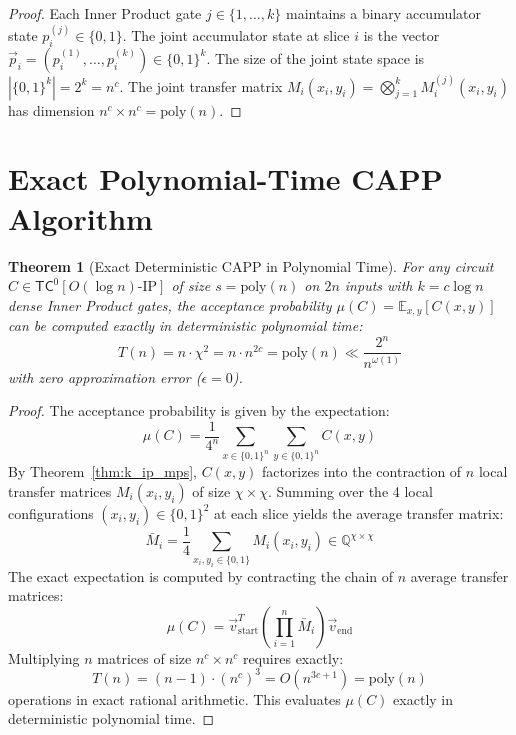\documentclass[11pt,letterpaper]{article}
\newtheorem{theorem}{Theorem}[section]
\newcommand{\TC}{\mathsf{TC}}
\newcommand{\poly}{\mathrm{poly}}
\newcommand{\E}{\mathbb{E}}
\newcommand{\eps}{\epsilon}
\begin{document}
\begin{proof}
Each Inner Product gate $j \in \{1, \dots, k\}$ maintains a binary accumulator state $p^{(j)}_i \in \{0, 1\}$. The joint accumulator state at slice $i$ is the vector $\vec{p}_i = (p^{(1)}_i, \dots, p^{(k)}_i) \in \{0, 1\}^k$. The size of the joint state space is $|\{0, 1\}^k| = 2^k = n^c$. The joint transfer matrix $M_i(x_i, y_i) = \bigotimes_{j=1}^k M_i^{(j)}(x_i, y_i)$ has dimension $n^c \times n^c = \poly(n)$.
\end{proof}

\section{Exact Polynomial-Time CAPP Algorithm}

\begin{theorem}[Exact Deterministic CAPP in Polynomial Time]
\label{thm:exact_capp}
For any circuit $C \in \TC^0[O(\log n)\text{-}\mathrm{IP}]$ of size $s = \poly(n)$ on $2n$ inputs with $k = c \log n$ dense Inner Product gates, the acceptance probability $\mu(C) = \E_{x, y}[C(x, y)]$ can be computed \emph{exactly} in deterministic polynomial time:
\[
T(n) = n \cdot \chi^2 = n \cdot n^{2c} = \poly(n) \ll \frac{2^n}{n^{\omega(1)}}
\]
with zero approximation error ($\eps = 0$).
\end{theorem}

\begin{proof}
The acceptance probability is given by the expectation:
\[
\mu(C) = \frac{1}{4^n} \sum_{x \in \{0,1\}^n} \sum_{y \in \{0,1\}^n} C(x, y)
\]
By Theorem~\ref{thm:k_ip_mps}, $C(x, y)$ factorizes into the contraction of $n$ local transfer matrices $M_i(x_i, y_i)$ of size $\chi \times \chi$. Summing over the 4 local configurations $(x_i, y_i) \in \{0,1\}^2$ at each slice yields the average transfer matrix:
\[
\bar{M}_i = \frac{1}{4} \sum_{x_i, y_i \in \{0,1\}} M_i(x_i, y_i) \in \mathbb{Q}^{\chi \times \chi}
\]
The exact expectation is computed by contracting the chain of $n$ average transfer matrices:
\[
\mu(C) = \vec{v}_{\mathrm{start}}^T \left( \prod_{i=1}^n \bar{M}_i \right) \vec{v}_{\mathrm{end}}
\]
Multiplying $n$ matrices of size $n^c \times n^c$ requires exactly:
\[
T(n) = (n - 1) \cdot (n^c)^3 = O(n^{3c + 1}) = \poly(n)
\]
operations in exact rational arithmetic. This evaluates $\mu(C)$ exactly in deterministic polynomial time.
\end{proof}
\end{document}
